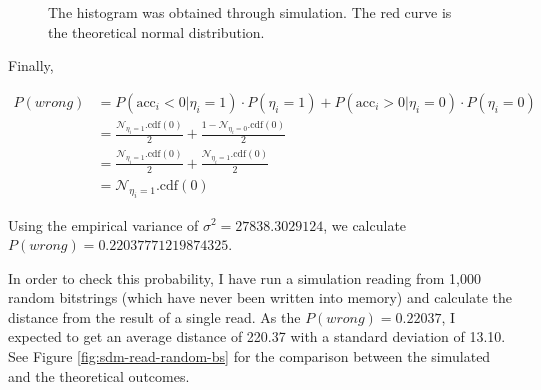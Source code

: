 \begin{figure}[h!]
  \centering

  \caption{The histogram was obtained through simulation. The red curve is the theoretical normal distribution.}
  \label{fig:sdm-read}
\end{figure}


Finally,

\begin{align}
P(wrong) &= P(\text{acc}_i < 0 | \eta_i = 1) \cdot P(\eta_i = 1) + P(\text{acc}_i > 0 | \eta_i = 0) \cdot P(\eta_i = 0) \\
    &= \frac{\mathcal{N}_{\eta_i=1}.\text{cdf}(0)}{2} + \frac{1-\mathcal{N}_{\eta_i=0}.\text{cdf}(0)}{2} \\
    &= \frac{\mathcal{N}_{\eta_i=1}.\text{cdf}(0)}{2} + \frac{\mathcal{N}_{\eta_i=1}.\text{cdf}(0)}{2} \\
    &= \mathcal{N}_{\eta_i=1}.\text{cdf}(0)
\end{align}

Using the empirical variance of $\sigma^2 = 27838.3029124$, we calculate $P(wrong) = 0.22037771219874325$.

In order to check this probability, I have run a simulation reading from 1,000 random bitstrings (which have never been written into memory) and calculate the distance from the result of a single read. As the $P(wrong) = 0.22037$, I expected to get an average distance of 220.37 with a standard deviation of 13.10. See Figure \ref{fig:sdm-read-random-bs} for the comparison between the simulated and the theoretical outcomes.

